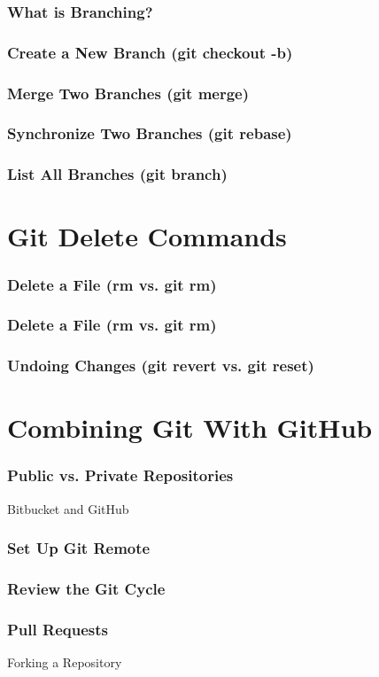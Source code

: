 \begin{frame}
    \frametitle{What is Branching?}
\end{frame}

\begin{frame}
    \frametitle{Create a New Branch (git checkout -b)}
\end{frame}

\begin{frame}
    \frametitle{Merge Two Branches (git merge)}
\end{frame}

\begin{frame}
    \frametitle{Synchronize Two Branches (git rebase)}
\end{frame}

\begin{frame}
    \frametitle{List All Branches (git branch)}
\end{frame}


\section[Delete]{Git Delete Commands}
\begin{frame}
    \frametitle{Delete a File (rm vs. git rm)}
\end{frame}

\begin{frame}
    \frametitle{Delete a File (rm vs. git rm)}
\end{frame}

\begin{frame}
    \frametitle{Undoing Changes (git revert vs. git reset)}
\end{frame}


\section[GitHub]{Combining Git With GitHub}
\begin{frame}
    \frametitle{Public vs. Private Repositories}
    Bitbucket and GitHub
\end{frame}

\begin{frame}
    \frametitle{Set Up Git Remote}
\end{frame}


\begin{frame}
    \frametitle{Review the Git Cycle}
\end{frame}

\begin{frame}
    \frametitle{Pull Requests}
    Forking a Repository
\end{frame}


\begin{frame}
\frametitle{\large{}}
	\huge{\center{\color{RUBblau}{Thank you for your attention.}}}
\end{frame}



